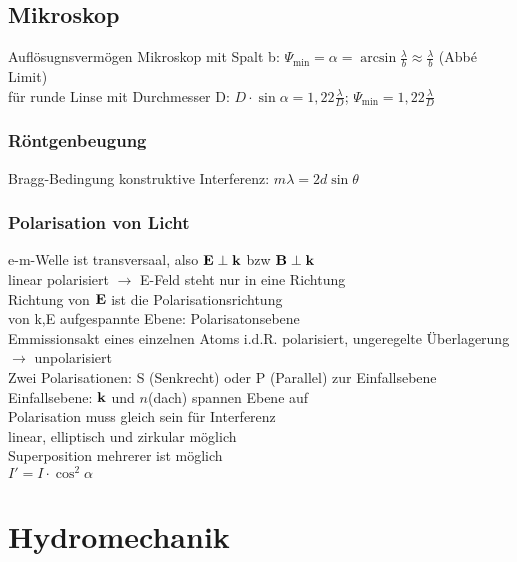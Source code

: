 \documentclass[fs, footer]{latex4ei}
\begin{document}
\begin{multicols*}{4}
\subsection{Mikroskop}
Auflösugnsvermögen Mikroskop mit Spalt b: $\Psi_{\text{min}} = \alpha = \arcsin\frac{\lambda}{b} \approx \frac{\lambda}{b}$ (Abbé Limit)\\
für runde Linse mit Durchmesser D: $D\cdot\sin\alpha = 1,22\frac{\lambda}{D}$; $\Psi_{\text{min}} = 1,22\frac{\lambda}{D}$\\
\subsubsection{Röntgenbeugung}
Bragg-Bedingung konstruktive Interferenz: $m\lambda = 2d\sin\theta$\\
\subsubsection{Polarisation von Licht}
e-m-Welle ist transversaal, also $\textbf{E} \perp \textbf{k}$ bzw $\textbf{B}\perp\textbf{k}$\\
linear polarisiert $\rightarrow$ E-Feld steht nur in eine Richtung\\
Richtung von $\textbf{E}$ ist die Polarisationsrichtung\\
von k,E aufgespannte Ebene: Polarisatonsebene\\
Emmissionsakt eines einzelnen Atoms i.d.R. polarisiert, ungeregelte Überlagerung $\rightarrow$ unpolarisiert\\
Zwei Polarisationen:
S (Senkrecht) oder P (Parallel) zur Einfallsebene\\
Einfallsebene: $\textbf{k}$ und $n$(dach) spannen Ebene auf\\
Polarisation muss gleich sein für Interferenz\\
linear, elliptisch und zirkular möglich\\
Superposition mehrerer ist möglich\\
$I' = I\cdot\cos ^2\alpha$\\





\section{Hydromechanik}




\end{multicols*}
\end{document}
